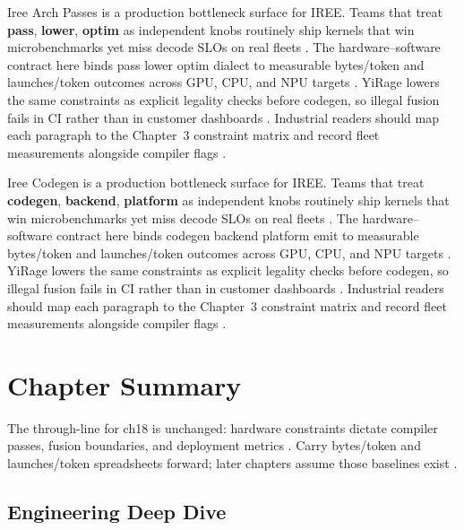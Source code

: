 Iree Arch Passes is a production bottleneck surface for IREE. Teams that treat \textbf{pass}, \textbf{lower}, \textbf{optim} as independent knobs routinely ship kernels that win microbenchmarks yet miss decode SLOs on real fleets \citep{nvidia2022hopper,amd2024aie}. The hardware--software contract here binds pass lower optim dialect to measurable bytes/token and launches/token outcomes across GPU, CPU, and NPU targets \citep{semianalysis2024tma,dlbook}. YiRage lowers the same constraints as explicit legality checks before codegen, so illegal fusion fails in CI rather than in customer dashboards \citep{amd2024xdna,dao2022flashattention}. Industrial readers should map each paragraph to the Chapter~3 constraint matrix and record fleet measurements alongside compiler flags \citep{amd2024aie,kwon2023vllm}.

Iree Codegen is a production bottleneck surface for IREE. Teams that treat \textbf{codegen}, \textbf{backend}, \textbf{platform} as independent knobs routinely ship kernels that win microbenchmarks yet miss decode SLOs on real fleets \citep{semianalysis2024tma,dlbook}. The hardware--software contract here binds codegen backend platform emit to measurable bytes/token and launches/token outcomes across GPU, CPU, and NPU targets \citep{amd2024xdna,dao2022flashattention}. YiRage lowers the same constraints as explicit legality checks before codegen, so illegal fusion fails in CI rather than in customer dashboards \citep{amd2024aie,kwon2023vllm}. Industrial readers should map each paragraph to the Chapter~3 constraint matrix and record fleet measurements alongside compiler flags \citep{dlbook,nvidia2024cudagraphs}.

\section{Chapter Summary}
\label{sec:ch18_summary}

The through-line for ch18 is unchanged: hardware constraints dictate compiler passes, fusion boundaries, and deployment metrics \citep{memoryfloor2026,amd2024xdna}. Carry bytes/token and launches/token spreadsheets forward; later chapters assume those baselines exist \citep{semianalysis2024tma,dlbook}.


\subsection{Engineering Deep Dive}
\label{sec:ch18_deep_dive}

